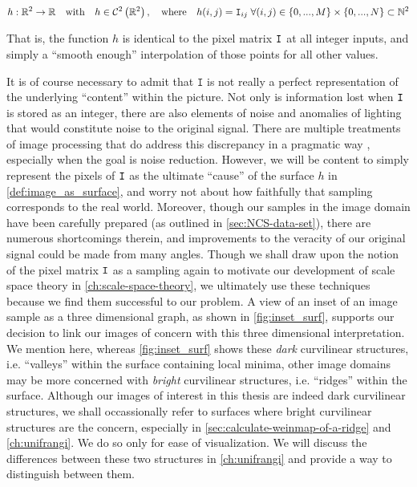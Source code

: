 \begin{defn} \label{def:image_as_surface}
 \begin{equation*}
 h: \mathbb{R}^2 \to \mathbb{R}
 \quad \textrm{with}\quad
 h \in \mathcal{C}^2\left(\mathbb{R}^2\right),
 \quad\textrm{where}\quad
    h(i,j) = \mathtt{I}_{ij}
    \; \forall (i,j) \in
     \left\{0,...,M\right\} \times
     \left\{0,...,N\right\} \subset \mathbb{N}^2
    \end{equation*}
\end{defn}
That is, the function $h$ is identical to the pixel matrix $\mathtt{I}$ at all integer inputs,
and simply a ``smooth enough'' interpolation of those points for all other values.


It is of course necessary to admit that $\mathtt{I}$ is not really a perfect representation of the underlying ``content'' within the picture. Not only is information lost when $\mathtt{I}$ is stored as an integer, there are also elements of noise and anomalies of lighting that would constitute noise to the original signal. There are multiple treatments of image processing that do address this discrepancy in a pragmatic way \cite{DIPGW}, especially when the goal is noise reduction.
However, we will be content to simply represent the pixels of $\mathtt{I}$ as the ultimate ``cause'' of the surface $h$ in \cref{def:image_as_surface}, and worry not about how faithfully that sampling corresponds to the real world.
Moreover, though our samples in the image domain have been carefully prepared (as outlined in \cref{sec:NCS-data-set}), there are numerous shortcomings therein, and improvements to the veracity of our original signal could be made from many angles.
Though we shall draw upon the notion of the pixel matrix $\mathtt{I}$ as a sampling again to motivate our development of scale space theory in \cref{ch:scale-space-theory}, we ultimately use these techniques because we find them successful to our problem. A view of an inset of an image sample as a three dimensional graph, as shown in \cref{fig:inset_surf}, supports our decision to link our images of concern with this  three dimensional interpretation. We mention here, whereas \cref{fig:inset_surf} shows these \textit{dark} curvilinear structures, i.e. ``valleys'' within the surface containing local minima, other image domains may be more concerned with \textit{bright} curvilinear structures, i.e. ``ridges'' within the surface. Although our images of interest in this thesis are indeed dark curvilinear structures, we shall occassionally refer to surfaces where bright curvilinear structures are the concern, especially in \cref{sec:calculate-weinmap-of-a-ridge} and \cref{ch:unifrangi}. We do so only for ease of visualization. We will discuss the differences between these two structures in \cref{ch:unifrangi} and provide a way to distinguish between them.

